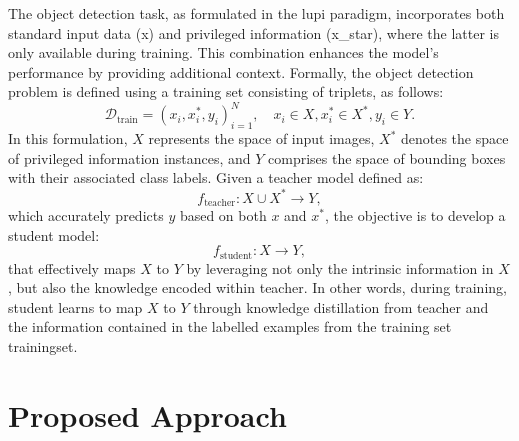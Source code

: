 The object detection task, as formulated in the \gls{lupi} paradigm, incorporates both standard input data (\gls{x}) and privileged information (\gls{x_star}), where the latter is only available during training. This combination enhances the model's performance by providing additional context. Formally, the object detection problem is defined using a training set consisting of triplets, as follows:
\begin{equation} \label{eq:object_detection}
\mathcal D_{\text{train}} = {(x_i, x_i^*, y_i)}_{i=1}^N, \quad x_i \in X , x_i^* \in X^*, y_i \in Y.
\end{equation}
In this formulation, \( X \) represents the space of input images, \( X^* \) denotes the space of privileged information instances, and \( Y \) comprises the space of bounding boxes with their associated class labels. Given a teacher model defined as:
\begin{equation}
f_{\text{teacher}}: X \cup X^* \rightarrow Y,
\end{equation}
which accurately predicts \( y \) based on both \( x \) and \( x^* \), the objective is to develop a student model:
\begin{equation}
f_{\text{student}}: X \rightarrow Y,
\end{equation}
that effectively maps \( X \) to \( Y \) by leveraging not only the intrinsic information in \( X \), but also the knowledge encoded within \gls{teacher}. In other words, during training, \gls{student} learns to map \( X \) to \( Y \) through knowledge distillation from \gls{teacher} and the information contained in the labelled examples from the training set \gls{trainingset}.

\section{Proposed Approach}
\label{sec:4_proposed_approach}

